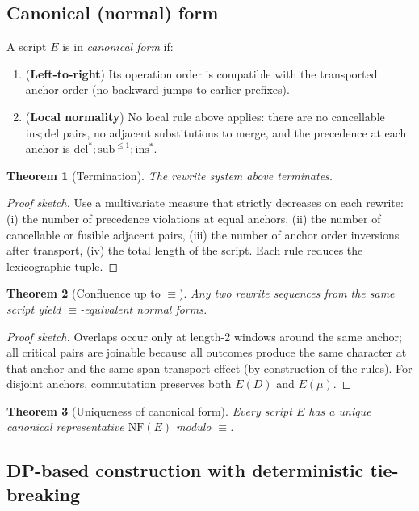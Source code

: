 \documentclass{article}
\newtheorem{theorem}{Theorem}
\begin{document}
\subsection{Canonical (normal) form}

A script $E$ is in \emph{canonical form} if:
\begin{enumerate}
	\item (\textbf{Left-to-right}) Its operation order is compatible with the transported
	anchor order (no backward jumps to earlier prefixes).
	\item (\textbf{Local normality}) No local rule above applies:
	there are no cancellable $\mathrm{ins};\mathrm{del}$ pairs, no adjacent substitutions to merge,
	and the precedence at each anchor is $\mathrm{del}^*;\mathrm{sub}^{\le 1};\mathrm{ins}^*$.
\end{enumerate}

\begin{theorem}[Termination]
	The rewrite system above terminates. 
\end{theorem}
\begin{proof}[Proof sketch]
	Use a multivariate measure that strictly decreases on each rewrite:
	(i) the number of precedence violations at equal anchors,
	(ii) the number of cancellable or fusible adjacent pairs,
	(iii) the number of anchor order inversions after transport,
	(iv) the total length of the script. Each rule reduces the lexicographic tuple.
\end{proof}

\begin{theorem}[Confluence up to $\equiv$]
	Any two rewrite sequences from the same script yield $\equiv$-equivalent normal forms.
\end{theorem}
\begin{proof}[Proof sketch]
	Overlaps occur only at length-2 windows around the same anchor; all critical pairs
	are joinable because all outcomes produce the same character at that anchor and the
	same span-transport effect (by construction of the rules). For disjoint anchors, 
	commutation preserves both $E(D)$ and $E(\mu)$.
\end{proof}

\begin{theorem}[Uniqueness of canonical form]
	Every script $E$ has a unique canonical representative $\mathrm{NF}(E)$ modulo $\equiv$.
\end{theorem}

\subsection{DP-based construction with deterministic tie-breaking}
\end{document}
